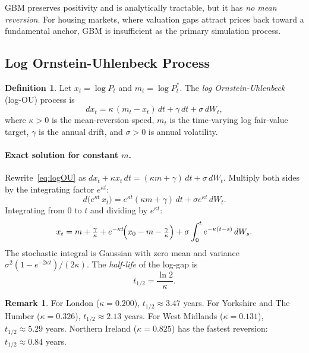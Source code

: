 \documentclass[11pt,a4paper]{article}
\theoremstyle{plain}
\theoremstyle{definition}
\newtheorem{definition}[theorem]{Definition}
\newtheorem{remark}[theorem]{Remark}
\newcommand{\Pstar}{P^{*}}
\newcommand{\kap}{\kappa}
\newcommand{\sig}{\sigma}
\begin{document}
GBM preserves positivity and is analytically tractable, but it has
\emph{no mean reversion}.  For housing markets, where valuation gaps
attract prices back toward a fundamental anchor, GBM is insufficient
as the primary simulation process.

\subsection{Log Ornstein-Uhlenbeck Process}

\begin{definition}
Let $x_t = \log P_t$ and $m_t = \log \Pstar_t$.  The
\emph{log Ornstein-Uhlenbeck} (log-OU) process is
\begin{equation}\label{eq:logOU}
  dx_t = \kap\,(m_t - x_t)\,dt + \gamma\,dt + \sig\,dW_t,
\end{equation}
where $\kap > 0$ is the mean-reversion speed, $m_t$ is the time-varying
log fair-value target, $\gamma$ is the annual drift, and $\sig > 0$ is
annual volatility.
\end{definition}

\paragraph{Exact solution for constant $m$.}
Rewrite~\eqref{eq:logOU} as
$dx_t + \kap x_t\,dt = (\kap m + \gamma)\,dt + \sig\,dW_t$.
Multiply both sides by the integrating factor $e^{\kap t}$:
\[
  d\bigl(e^{\kap t}\,x_t\bigr) = e^{\kap t}(\kap m + \gamma)\,dt + \sig e^{\kap t}\,dW_t.
\]
Integrating from $0$ to $t$ and dividing by $e^{\kap t}$:
\begin{equation}\label{eq:OUexact}
  x_t = m + \tfrac{\gamma}{\kap}
        + e^{-\kap t}\!\Bigl(x_0 - m - \tfrac{\gamma}{\kap}\Bigr)
        + \sig\int_0^t e^{-\kap(t-s)}\,dW_s.
\end{equation}
The stochastic integral is Gaussian with zero mean and variance
$\sig^2(1-e^{-2\kap t})/(2\kap)$.  The \emph{half-life} of the
log-gap is
\begin{equation}
  t_{1/2} = \frac{\ln 2}{\kap}.
\end{equation}

\begin{remark}
For London ($\kap = 0.200$), $t_{1/2} \approx 3.47$ years.
For Yorkshire and The Humber ($\kap = 0.326$), $t_{1/2} \approx 2.13$ years.
For West Midlands ($\kap = 0.131$), $t_{1/2} \approx 5.29$ years.
Northern Ireland ($\kap = 0.825$) has the fastest reversion:
$t_{1/2} \approx 0.84$ years.
\end{remark}
\end{document}

